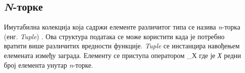 \documentclass[12pt,oneside]{memoir}
\begin{document}

%
%
%


%



\subsection{\textit{N}-торке}
\label{subsec:scala_tuple}

Имутабилна колекција која садржи елементе различитог типа се назива \textit{n}-торка (енг. \textit{Tuple}) \cite{scala_prog}. Ова структура података се може користити када је потребно вратити више различитих вредности функције. \textit{Tuple} се инстанцира навођењем елемената између заграда. Елементу се приступа оператором \_Х где је \textit{Х} редни број елемента унутар \textit{n}-торке.
\end{document}
